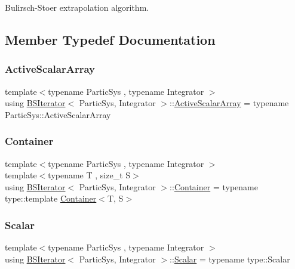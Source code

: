 Bulirsch-\/\+Stoer extrapolation algorithm. 

\subsection{Member Typedef Documentation}
\mbox{\label{class_b_s_iterator_af31c4a9064840d867fb41f3b4a7b2a6e}} 
\subsubsection{\texorpdfstring{Active\+Scalar\+Array}{ActiveScalarArray}}
{\footnotesize\ttfamily template$<$typename Partic\+Sys , typename Integrator $>$ \\
using \mbox{\hyperlink{class_b_s_iterator}{B\+S\+Iterator}}$<$ Partic\+Sys, Integrator $>$\+::\mbox{\hyperlink{class_b_s_iterator_af31c4a9064840d867fb41f3b4a7b2a6e}{Active\+Scalar\+Array}} =  typename Partic\+Sys\+::\+Active\+Scalar\+Array}

\mbox{\label{class_b_s_iterator_a1cb5a9b8f7ff3746a15007780c9a7b87}} 
\subsubsection{\texorpdfstring{Container}{Container}}
{\footnotesize\ttfamily template$<$typename Partic\+Sys , typename Integrator $>$ \\
template$<$typename T , size\+\_\+t S$>$ \\
using \mbox{\hyperlink{class_b_s_iterator}{B\+S\+Iterator}}$<$ Partic\+Sys, Integrator $>$\+::\mbox{\hyperlink{class_b_s_iterator_a1cb5a9b8f7ff3746a15007780c9a7b87}{Container}} =  typename type\+::template \mbox{\hyperlink{class_b_s_iterator_a1cb5a9b8f7ff3746a15007780c9a7b87}{Container}}$<$T, S$>$}

\mbox{\label{class_b_s_iterator_a44773ad0f46d97005c8e21fa7c155c6f}} 
\subsubsection{\texorpdfstring{Scalar}{Scalar}}
{\footnotesize\ttfamily template$<$typename Partic\+Sys , typename Integrator $>$ \\
using \mbox{\hyperlink{class_b_s_iterator}{B\+S\+Iterator}}$<$ Partic\+Sys, Integrator $>$\+::\mbox{\hyperlink{class_b_s_iterator_a44773ad0f46d97005c8e21fa7c155c6f}{Scalar}} =  typename type\+::\+Scalar}

